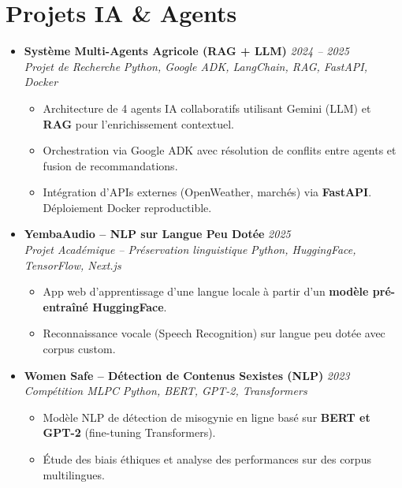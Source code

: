 \documentclass[a4paper,11pt]{article}
\begin{document}
\section{Projets IA \& Agents}
\begin{itemize}[leftmargin=*, label={-}]

\item \textbf{Système Multi-Agents Agricole (RAG + LLM)} \hfill \textit{2024 -- 2025} \\
\textit{Projet de Recherche} \hfill \textit{Python, Google ADK, LangChain, RAG, FastAPI, Docker}
\vspace{-2pt}
    \begin{itemize}[leftmargin=0.4cm, nosep, label=\tiny$\bullet$]
        \item \small{Architecture de 4 agents IA collaboratifs utilisant Gemini (LLM) et \textbf{RAG} pour l'enrichissement contextuel.}
        \item \small{Orchestration via Google ADK avec résolution de conflits entre agents et fusion de recommandations.}
        \item \small{Intégration d'APIs externes (OpenWeather, marchés) via \textbf{FastAPI}. Déploiement Docker reproductible.}
    \end{itemize}
\vspace{3pt}

\item \textbf{YembaAudio -- NLP sur Langue Peu Dotée} \hfill \textit{2025} \\
\textit{Projet Académique -- Préservation linguistique} \hfill \textit{Python, HuggingFace, TensorFlow, Next.js}
\vspace{-2pt}
    \begin{itemize}[leftmargin=0.4cm, nosep, label=\tiny$\bullet$]
        \item \small{App web d'apprentissage d'une langue locale à partir d'un \textbf{modèle pré-entraîné HuggingFace}.}
        \item \small{Reconnaissance vocale (Speech Recognition) sur langue peu dotée avec corpus custom.}
    \end{itemize}
\vspace{3pt}

\item \textbf{Women Safe -- Détection de Contenus Sexistes (NLP)} \hfill \textit{2023} \\
\textit{Compétition MLPC} \hfill \textit{Python, BERT, GPT-2, Transformers}
\vspace{-2pt}
    \begin{itemize}[leftmargin=0.4cm, nosep, label=\tiny$\bullet$]
        \item \small{Modèle NLP de détection de misogynie en ligne basé sur \textbf{BERT et GPT-2} (fine-tuning Transformers).}
        \item \small{Étude des biais éthiques et analyse des performances sur des corpus multilingues.}
    \end{itemize}
\vspace{3pt}

\end{itemize}
\end{document}
